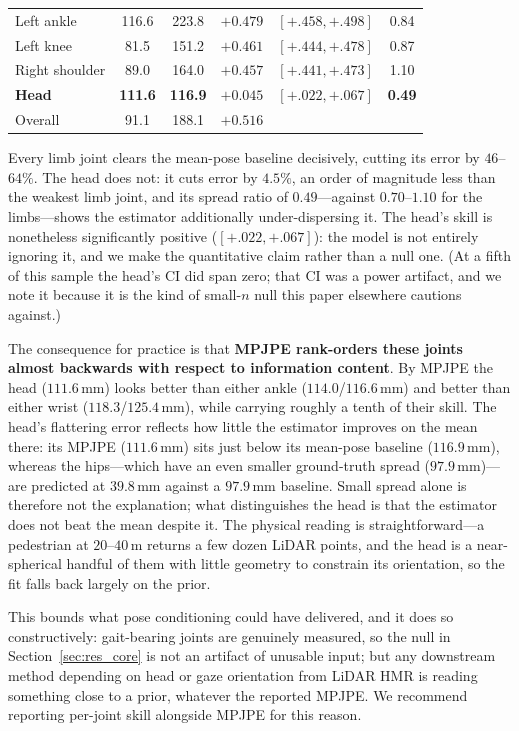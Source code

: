 \documentclass{article} %
\begin{document}
\begin{table}[t]
\begin{center}
\begin{tabular}{lccccc}
Left ankle     & 116.6 & 223.8 & $+0.479$ & $[+.458,+.498]$ & 0.84 \\
Left knee      &  81.5 & 151.2 & $+0.461$ & $[+.444,+.478]$ & 0.87 \\
Right shoulder &  89.0 & 164.0 & $+0.457$ & $[+.441,+.473]$ & 1.10 \\
\rowcolor{black!8}
\textbf{Head}  &  \textbf{111.6} & \textbf{116.9} & $\mathbf{+0.045}$ & $\mathbf{[+.022,+.067]}$ & \textbf{0.49} \\
\midrule
Overall        &  91.1 & 188.1 & $+0.516$ & & \\
\bottomrule
\end{tabular}
\end{center}
\end{table}

Every limb joint clears the mean-pose baseline decisively, cutting its error by
$46$--$64\%$. The head does not: it cuts error by $4.5\%$, an order of magnitude
less than the weakest limb joint, and its spread ratio of $0.49$---against
$0.70$--$1.10$ for the limbs---shows the estimator additionally under-dispersing
it. The head's skill is nonetheless significantly positive
($[+.022,+.067]$): the model is not entirely ignoring it, and we make the
quantitative claim rather than a null one. (At a fifth of this sample the head's CI
did span zero; that CI was a power artifact, and we note it because it is the kind
of small-$n$ null this paper elsewhere cautions against.)

The consequence for practice is that \textbf{MPJPE rank-orders these joints almost
backwards with respect to information content}. By MPJPE the head ($111.6$\,mm)
looks better than either ankle ($114.0$/$116.6$\,mm) and better than either wrist
($118.3$/$125.4$\,mm), while carrying roughly a tenth of their skill. The head's
flattering error reflects how little the estimator improves on the mean there: its
MPJPE ($111.6$\,mm) sits just below its mean-pose baseline ($116.9$\,mm), whereas
the hips---which have an even smaller ground-truth spread ($97.9$\,mm)---are
predicted at $39.8$\,mm against a $97.9$\,mm baseline. Small spread alone is
therefore not the explanation; what distinguishes the head is that the estimator
does not beat the mean despite it. The physical reading is
straightforward---a pedestrian at $20$--$40$\,m returns a few dozen LiDAR points,
and the head is a near-spherical handful of them with little geometry to constrain
its orientation, so the fit falls back largely on the prior.

This bounds what pose conditioning could have delivered, and it does so
constructively: gait-bearing joints are genuinely measured, so the null in
Section~\ref{sec:res_core} is not an artifact of unusable input; but any
downstream method depending on head or gaze orientation from LiDAR HMR is reading
something close to a prior, whatever the reported MPJPE. We recommend reporting per-joint skill
alongside MPJPE for this reason.
\end{document}
